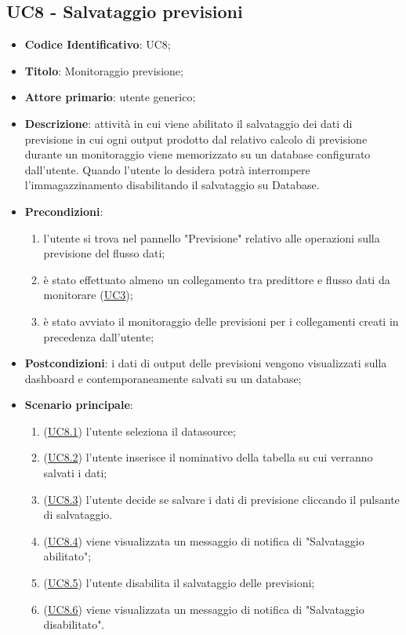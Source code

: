 	\subsection{UC8 - Salvataggio previsioni}
		\begin{itemize}
			\item\textbf{Codice Identificativo}: UC8;
			\item\textbf{Titolo}: Monitoraggio previsione;
			\item\textbf{Attore primario}: utente generico;
			\item\textbf{Descrizione}: attività in cui viene abilitato il salvataggio dei dati di previsione in cui ogni output prodotto dal relativo calcolo di previsione durante un monitoraggio viene memorizzato su un database configurato dall'utente. Quando l'utente lo desidera potrà interrompere l'immagazzinamento disabilitando il salvataggio su Database.
			\item\textbf{Precondizioni}:
				\begin{enumerate}
					\item l'utente si trova nel pannello "Previsione" relativo alle operazioni sulla previsione del flusso dati;
					\item è stato effettuato almeno un collegamento tra predittore e flusso dati da monitorare (\hyperref[par:UC3]{UC3});
					\item è stato avviato il monitoraggio delle previsioni per i collegamenti creati in precedenza dall'utente;
				\end{enumerate}		
	\item\textbf{Postcondizioni}: i dati di output delle previsioni vengono visualizzati sulla dashboard e contemporaneamente salvati su un database;
			\item\textbf{Scenario principale}:
				\begin{enumerate}
				    \item (\hyperref[par:UC8.1]{UC8.1}) l'utente seleziona il datasource;
				    \item (\hyperref[par:UC8.2]{UC8.2}) l'utente inserisce il nominativo della tabella su cui verranno salvati i dati;
				    
					\item (\hyperref[par:UC8.3]{UC8.3}) l'utente decide se salvare i dati di previsione cliccando il pulsante di salvataggio.	
					\item (\hyperref[par:UC8.4]{UC8.4}) viene visualizzata un messaggio di notifica di "Salvataggio abilitato";
					\item (\hyperref[par:UC8.5]{UC8.5}) l'utente disabilita il salvataggio delle previsioni;
				    \item (\hyperref[par:UC8.6]{UC8.6}) viene visualizzata un messaggio di notifica di "Salvataggio disabilitato".
				\end{enumerate}
		\end{itemize}
		
